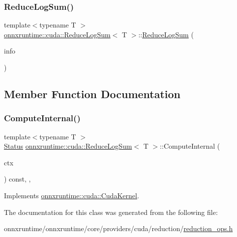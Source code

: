 \subsubsection{\texorpdfstring{Reduce\+Log\+Sum()}{ReduceLogSum()}}
{\footnotesize\ttfamily template$<$typename T $>$ \\
\mbox{\hyperlink{classonnxruntime_1_1cuda_1_1ReduceLogSum}{onnxruntime\+::cuda\+::\+Reduce\+Log\+Sum}}$<$ T $>$\+::\mbox{\hyperlink{classonnxruntime_1_1cuda_1_1ReduceLogSum}{Reduce\+Log\+Sum}} (\begin{DoxyParamCaption}\item[{const \mbox{\hyperlink{classonnxruntime_1_1OpKernelInfo}{Op\+Kernel\+Info}} \&}]{info }\end{DoxyParamCaption})\hspace{0.3cm}{\ttfamily [inline]}}



\subsection{Member Function Documentation}
\mbox{\label{classonnxruntime_1_1cuda_1_1ReduceLogSum_ac4051b87fd92e041fc6a4ef367565203}} 
\subsubsection{\texorpdfstring{Compute\+Internal()}{ComputeInternal()}}
{\footnotesize\ttfamily template$<$typename T $>$ \\
\mbox{\hyperlink{classonnxruntime_1_1common_1_1Status}{Status}} \mbox{\hyperlink{classonnxruntime_1_1cuda_1_1ReduceLogSum}{onnxruntime\+::cuda\+::\+Reduce\+Log\+Sum}}$<$ T $>$\+::Compute\+Internal (\begin{DoxyParamCaption}\item[{\mbox{\hyperlink{classonnxruntime_1_1OpKernelContext}{Op\+Kernel\+Context}} $\ast$}]{ctx }\end{DoxyParamCaption}) const\hspace{0.3cm}{\ttfamily [inline]}, {\ttfamily [override]}, {\ttfamily [virtual]}}



Implements \mbox{\hyperlink{classonnxruntime_1_1cuda_1_1CudaKernel_aca7af04ae448017d6023d30bba231ebb}{onnxruntime\+::cuda\+::\+Cuda\+Kernel}}.



The documentation for this class was generated from the following file\+:\begin{DoxyCompactItemize}
\item 
onnxruntime/onnxruntime/core/providers/cuda/reduction/\mbox{\hyperlink{cuda_2reduction_2reduction__ops_8h}{reduction\+\_\+ops.\+h}}\end{DoxyCompactItemize}
